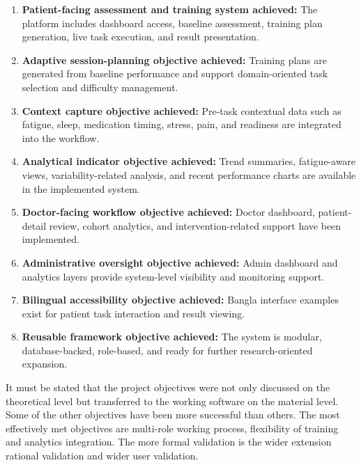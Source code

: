\documentclass[12pt,a4paper]{report}
\begin{document}
\begin{enumerate}[leftmargin=0.6in]
\item \textbf{Patient-facing assessment and training system achieved:} The platform includes dashboard access, baseline assessment, training plan generation, live task execution, and result presentation.
\item \textbf{Adaptive session-planning objective achieved:} Training plans are generated from baseline performance and support domain-oriented task selection and difficulty management.
\item \textbf{Context capture objective achieved:} Pre-task contextual data such as fatigue, sleep, medication timing, stress, pain, and readiness are integrated into the workflow.
\item \textbf{Analytical indicator objective achieved:} Trend summaries, fatigue-aware views, variability-related analysis, and recent performance charts are available in the implemented system.
\item \textbf{Doctor-facing workflow objective achieved:} Doctor dashboard, patient-detail review, cohort analytics, and intervention-related support have been implemented.
\item \textbf{Administrative oversight objective achieved:} Admin dashboard and analytics layers provide system-level visibility and monitoring support.
\item \textbf{Bilingual accessibility objective achieved:} Bangla interface examples exist for patient task interaction and result viewing.
\item \textbf{Reusable framework objective achieved:} The system is modular, database-backed, role-based, and ready for further research-oriented expansion.
\end{enumerate}

It must be stated that the project objectives were not only discussed on the theoretical level but transferred to the working software on the material level. Some of the other objectives have been more successful than others. The most effectively met objectives are multi-role working process, flexibility of training and analytics integration. The more formal validation is the wider extension rational validation and wider user validation.
\end{document}
